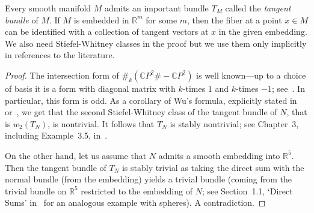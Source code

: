 \documentclass[10pt,a4paper]{article}
\newtheorem*{theorem*}{Theorem}
\theoremstyle{definition}
\theoremstyle{remark}
\newcommand{\R}{{\mathbb{R}}}
\newcommand{\CP}{{\mathbb{C}P}}
\begin{document}
 Every smooth manifold $M$ admits an important bundle $T_M$ called the
 \emph{tangent bundle} of $M$. If $M$ is embedded in $\R^m$ for some $m$, 
 then the fiber at a point $x \in M$ can be identified with a collection of tangent
 vectors at $x$ in the given embedding. We also need Stiefel-Whitney classes
 in the proof but we use them only implicitly in references to the literature.
 
\begin{proof}
The intersection form of $\#_k (\CP^2 \# - \CP^2)$ is well known---up to a choice
of basis it is a form with diagonal matrix with $k$-times $1$ and $k$-times
  $-1$; see~\cite{kirby89,scorpan05}. In particular, this form is odd. As a corollary of Wu's formula,
  explicitly stated in~\cite[Lemma~4.1, Chap. II]{kirby89} or~\cite[Sec.~4.3]{scorpan05}, we get that the second
  Stiefel-Whitney class of the tangent bundle of $N$, that is $w_2(T_N)$,
  is nontrivial. It follows that $T_N$ is
  stably nontrivial; see Chapter~3, including Example~3.5, in~\cite{hatcher17}. 
  
  On the other hand, let us assume that $N$ admits a smooth embedding into
  $\R^5$. Then the tangent bundle of $T_N$ is stably trivial as taking the
  direct sum with the normal bundle (from the embedding) yields a trivial
  bundle (coming from the trivial bundle on $\R^5$ restricted to the embedding
  of $N$; see Section~1.1, `Direct Sums' in~\cite{hatcher17} for an analogous
  example with spheres). A contradiction.
\end{proof}

%
\end{document}
